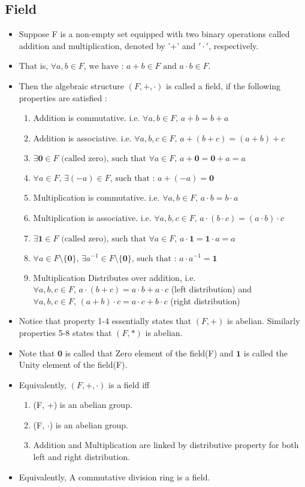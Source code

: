 \documentclass[twoside]{article}
\begin{document}
\subsection{Field}
\begin{itemize}
	\item Suppose F is a non-empty set equipped with two binary operations called addition and multiplication, denoted by '+' and $'\cdot'$, respectively. 
	\item That is, $\forall a,b \in F \text{, we have : } a + b \in F \text{ and } a \cdot b \in F $.
	\item Then the algebraic structure $(F, +, \cdot)$ is called a field, if the following properties are satisfied : 
		\begin{enumerate}
			\item Addition is commutative. i.e. $\forall a,b \in F \text{, } a + b = b + a$
			\item Addition is associative. i.e. $\forall a,b,c \in F \text{, } a + (b + c) = (a + b) + c$
			\item $\exists \mathbf{0}\in F \text{ (called zero), such that } \forall a \in F \text{, } a + \mathbf{0} = \mathbf{0} + a = a$
			\item $\forall a \in F \text{, } \exists (-a) \in F \text{, such that : } a + (-a) = \mathbf{0}$
			\item Multiplication is commutative. i.e. $\forall a,b \in F \text{, } a \cdot b = b \cdot a$
			\item Multiplication is associative. i.e. $\forall a,b,c \in F \text{, } a \cdot (b \cdot  c) = (a \cdot b) \cdot c$
			\item $\exists \mathbf{1}\in F \text{ (called zero), such that } \forall a \in F \text{, } a \cdot \mathbf{1} = \mathbf{1} \cdot a = a$
			\item $\forall a \in F \setminus\{ \mathbf{0} \} \text{, } \exists a^{-1} \in F \setminus \{\mathbf{0}\} \text{, such that : } a \cdot a^{-1} = \mathbf{1}$
			\item Multiplication Distributes over addition, i.e. $\forall a,b,c \in F \text{, } a \cdot (b + c) = a \cdot b + a \cdot c $ (left distribution) and $\forall a,b,c \in F \text{, } (a + b) \cdot c = a \cdot c + b \cdot c$ (right distribution)
		\end{enumerate}
	\item Notice that property 1-4 essentially states that $(F,+)$ is abelian. Similarly properties 5-8 states that $(F,*)$ is abelian.
	\item Note that $\mathbf{0}$ is called that Zero element of the field(F) and $\mathbf{1}$ is called the Unity element of the field(F).
	\item Equivalently, $(F, +, \cdot)$ is a field iff
		\begin{enumerate}
			\item (F, +) is an abelian group.
			\item (F, $\cdot$) is an abelian group.
			\item Addition and Multiplication are linked by distributive property for both left and right distribution.
		\end{enumerate}
	\item Equivalently, A commutative division ring is a field.
\end{itemize}
\end{document}
